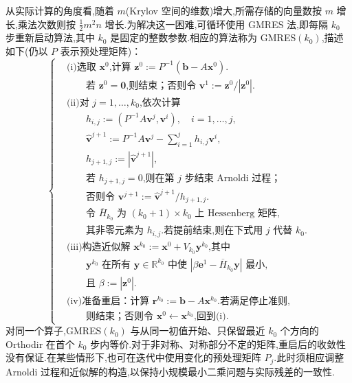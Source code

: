 从实际计算的角度看,随着 \(m\)(Krylov 空间的维数)增大,所需存储的向量数按 \(m\) 增长,乘法次数则按 \(\frac12m^2n\) 增长.为解决这一困难,可循环使用 GMRES 法,即每隔 \(k_0\) 步重新启动算法,其中 \(k_0\) 是固定的整数参数.相应的算法称为 GMRES\((k_0)\),描述如下(仍以 \(P\) 表示预处理矩阵)：
\begin{equation}\label{eq:2.6.23}
  \left\{
  \begin{aligned}
    &\text{(i)选取 \(\boldsymbol{x}^0\),计算 \(\boldsymbol{z}^0:=P^{-1}(\boldsymbol{b}-A\boldsymbol{x}^0)\).}\\
    &\qquad\text{若 \(\boldsymbol{z}^0=\boldsymbol{0}\),则结束；否则令 \(\boldsymbol{v}^1:=\boldsymbol{z}^0/|\boldsymbol{z}^0|\).}\\[2pt]
    &\text{(ii)对 \(j=1,\ldots,k_0\),依次计算}\\
    &\qquad h_{i,j}:=(P^{-1}A\boldsymbol{v}^j,\boldsymbol{v}^i),\quad i=1,\ldots,j,\\
    &\qquad\widehat{\boldsymbol{v}}^{j+1}:=P^{-1}A\boldsymbol{v}^j-\sum_{i=1}^j h_{i,j}\boldsymbol{v}^i,\\
    &\qquad h_{j+1,j}:=|\widehat{\boldsymbol{v}}^{j+1}|,\\
    &\qquad\text{若 \(h_{j+1,j}=0\),则在第 \(j\) 步结束 Arnoldi 过程；}\\
    &\qquad\text{否则令 \(\boldsymbol{v}^{j+1}:=\widehat{\boldsymbol{v}}^{j+1}/h_{j+1,j}\).}\\
    &\qquad\text{令 \(\overline H_{k_0}\) 为 \((k_0+1)\times k_0\) 上 Hessenberg 矩阵,}\\
    &\qquad\text{其非零元素为 \(h_{i,j}\).若提前结束,则在下式用 \(j\) 代替 \(k_0\).}\\[2pt]
    &\text{(iii)构造近似解 \(\boldsymbol{x}^{k_0}:=\boldsymbol{x}^0+V_{k_0}\boldsymbol{y}^{k_0}\),其中}\\
    &\qquad\text{\(\boldsymbol{y}^{k_0}\) 在所有 \(\boldsymbol{y}\in\mathbb R^{k_0}\) 中使 \(|\beta\boldsymbol{e}^1-\overline H_{k_0}\boldsymbol{y}|\) 最小,}\\
    &\qquad\text{且 \(\beta:=|\boldsymbol{z}^0|\).}\\[2pt]
    &\text{(iv)准备重启：计算 \(\boldsymbol{r}^{k_0}:=\boldsymbol{b}-A\boldsymbol{x}^{k_0}\).若满足停止准则,}\\
    &\qquad\text{则结束；否则令 \(\boldsymbol{x}^0\gets\boldsymbol{x}^{k_0}\),回到(i).}
  \end{aligned}
  \right.
\end{equation}
对同一个算子,GMRES\((k_0)\) 与从同一初值开始、只保留最近 \(k_0\) 个方向的 Orthodir 在首个 \(k_0\) 步内等价.对于非对称、对称部分不定的矩阵,重启后的收敛性没有保证.在某些情形下,也可在迭代中使用变化的预处理矩阵 \(P_j\).此时须相应调整 Arnoldi 过程和近似解的构造,以保持小规模最小二乘问题与实际残差的一致性.

